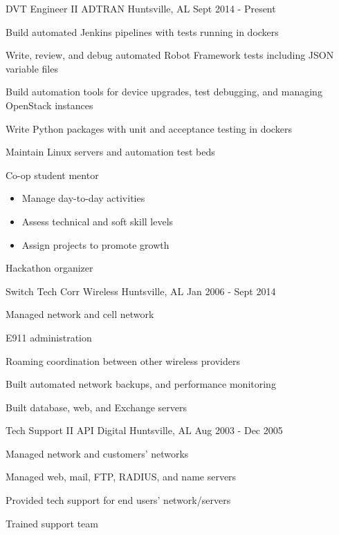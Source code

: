 
\begin{cventries}
  \cventry
    {DVT Engineer II} %
    {ADTRAN} %
    {Huntsville, AL} %
    {Sept 2014 - Present} %
    {
      \begin{cvitems} %
        \item {Build automated Jenkins pipelines with tests running in dockers}
        \item {Write, review, and debug automated Robot Framework tests including JSON variable files}
        \item {Build automation tools for device upgrades, test debugging, and managing OpenStack instances}
        \item {Write Python packages with unit and acceptance testing in dockers}
        \item {Maintain Linux servers and automation test beds}
        \item {Co-op student mentor}
            \begin{itemize}
                \item {Manage day-to-day activities}
                \item {Assess technical and soft skill levels}
                \item {Assign projects to promote growth}
            \end{itemize}
        \item {Hackathon organizer}
      \end{cvitems}
    }

  \cventry
    {Switch Tech} %
    {Corr Wireless} %
    {Huntsville, AL} %
    {Jan 2006 - Sept 2014} %
    {
      \begin{cvitems} %
        \item {Managed network and cell network}
        \item {E911 administration}
        \item {Roaming coordination between other wireless providers}
        \item {Built automated network backups, and performance monitoring}
        \item {Built database, web, and Exchange servers}
      \end{cvitems}
    }

  \cventry
    {Tech Support II} %
    {API Digital} %
    {Huntsville, AL} %
    {Aug 2003 - Dec 2005} %
    {
      \begin{cvitems} %
        \item {Managed network and customers' networks}
        \item {Managed web, mail, FTP, RADIUS, and name servers}
        \item {Provided tech support for end users' network/servers}
        \item {Trained support team}
      \end{cvitems}
    }

\end{cventries}
